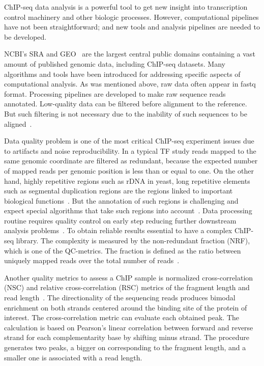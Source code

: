 ChIP-seq data analysis is a powerful tool to get new insight into transcription control machinery and other biologic processes. 
However, computational pipelines have not been straightforward; 
and new tools and analysis pipelines are needed to be developed.

NCBI's SRA and GEO~\cite{barrett2012ncbi} are the largest central public domains containing a vast amount of published genomic data, including ChIP-seq datasets. 
Many algorithms and tools have been introduced for addressing specific aspects of computational analysis. 
As was mentioned above, raw data often appear in fastq format. 
Processing pipelines are developed to make raw sequence reads annotated.
Low-quality data can be filtered before alignment to the reference. 
But such filtering is not necessary due to the inability of such sequences to be aligned~\cite{furey2012chip}.


Data quality problem is one of the most critical ChIP-seq experiment issues due to artifacts and noise reproducibility.
In a typical TF study reads mapped to the same genomic coordinate are filtered as redundant, because the expected number of mapped reads per genomic position is less than or equal to one. 
On the other hand, highly repetitive regions such as rDNA in yeast, long repetitive elements such as segmental duplication regions are the regions linked to important biological functions~\cite{nakato2017recent}. But the annotation of such regions is challenging and expect special algorithms that take such regions into account~\cite{chung2011discovering}.
Data processing routine requires quality control on early step reducing further downstream analysis problems~\cite{ewels2016multiqc}.
To obtain reliable results essential to have a complex ChIP-seq library.
The complexity is measured by the non-redundant fraction (NRF), which is one of the QC-metrics.
The fraction is defined as the ratio between uniquely mapped reads over the total number of reads~\cite{landt2012chip}.

Another quality metrics to assess a ChIP sample is normalized cross-correlation (NSC) and relative cross-correlation (RSC) metrics of the fragment length and read length~\cite{landt2012chip, marinov2014large}. 
The directionality of the sequencing reads produces bimodal enrichment on both strands centered around the binding site of the protein of interest. 
The cross-correlation metric can evaluate each obtained peak. 
The calculation is based on Pearson's linear correlation between forward and reverse strand for each complementarity base by shifting minus strand. 
The procedure generates two peaks, a bigger on corresponding to the fragment length, and a smaller one is associated with a read length. 



